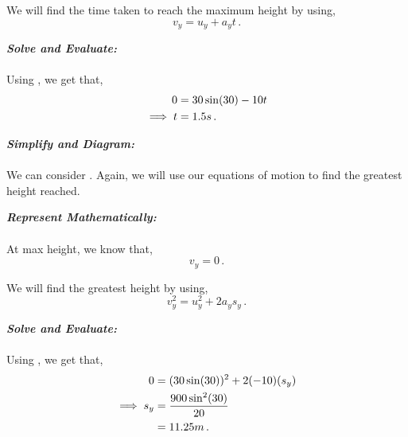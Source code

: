 \begin{subquestions}
We will find the time taken to reach the maximum height by using,
\begin{equation}
	v_y = u_y + a_yt \label{2005:q5:VEqn1} \,.
\end{equation}	
	



\textbf{\textit{Solve and Evaluate:}} \\ \\
Using , we get that,
\begin{align}
	0 & = 30\sin(30) -10t \nonumber \\
	\implies t & = 1.5s \,. 
\end{align}


\subquestion 

\textbf{\textit{Simplify and Diagram:}} \\ \\
We can consider . Again, we will use our equations of motion to find the greatest height reached. 




\textbf{\textit{Represent Mathematically:}} \\ \\
At max height, we know that,
\begin{equation}
	v_y = 0 \,.
\end{equation}

We will find the greatest height by using,
\begin{equation}
	v_y^2 = u_y^2 + 2a_ys_y \label{2005:q5:SEqn1} \,.
\end{equation}




\textbf{\textit{Solve and Evaluate:}} \\ \\
Using , we get that,
\begin{align}
	0 & = (30\sin(30))^2 + 2(-10)(s_y) \nonumber \\
	\implies s_y & = \frac{900\sin^2(30)}{20} \nonumber \\
	             & = 11.25m \,.	
\end{align}



\end{subquestions}
